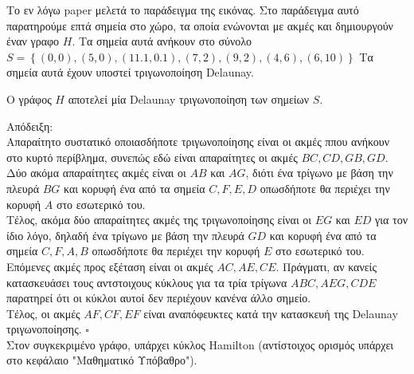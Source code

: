 \documentclass[oneside,12pt]{book}
\theoremstyle{definition}
\begin{document}
Το εν λόγω paper μελετά το παράδειγμα της εικόνας. Στο παράδειγμα αυτό παρατηρούμε επτά σημεία στο χώρο, τα οποία ενώνονται με ακμές και δημιουργούν έναν γραφο \(H\). Τα σημεία αυτά ανήκουν στο σύνολο \(S = \left\{(0,0),(5,0),(11.1,0.1),(7,2),(9,2),(4,6),(6,10)\right\}\) Τα σημεία αυτά έχουν υποστεί τριγωνοποίηση Delaunay. \\

\begin{mylemma}{}{}
	Ο γράφος \(Η\) αποτελεί μία Delaunay τριγωνοποίηση των σημείων \(S\).
\end{mylemma} 

Απόδειξη: \\
Απαραίτητο συστατικό οποιασδήποτε τριγωνοποίησης είναι οι ακμές ππου ανήκουν στο κυρτό περίβλημα, συνεπώς εδώ είναι απαραίτητες οι ακμές \(BC, CD, GB, GD\). \\
Δύο ακόμα απαραίτητες ακμές είναι οι \(AB\) και \(AG\), διότι ένα τρίγωνο με βάση την πλευρά \(BG\) και κορυφή ένα από τα σημεία \(C, F, E, D\) οπωσδήποτε θα περιέχει την κορυφή \(A\) στο εσωτερικό του. \\
Τέλος, ακόμα δύο απαραίτητες ακμές της τριγωνοποίησης είναι οι \(EG\) και \(ED\) για τον ίδιο λόγο, δηλαδή ένα τρίγωνο με βάση την πλευρά \(GD\) και κορυφή ένα από τα σημεία \(C, F, A, B\) οπωσδήποτε θα περιέχει την κορυφή \(E\) στο εσωτερικό του. \\
Επόμενες ακμές προς εξέταση είναι οι ακμές \(AC, AE, CE\). Πράγματι, αν κανείς κατασκευάσει τους αντστοιχους κύκλους για τα τρία τρίγωνα \(ABC, AEG, CDE\) παρατηρεί ότι οι κύκλοι αυτοί δεν περιέχουν κανένα άλλο σημείο. \\
Τέλος, οι ακμές \(AF, CF, EF\) είναι αναπόφευκτες κατά την κατασκευή της Delaunay τριγωνοποίησης. \(\square\) \\

Στον συγκεκριμένο γράφο, υπάρχει κύκλος Hamilton (αντίστοιχος ορισμός υπάρχει στο κεφάλαιο "Μαθηματικό Υπόβαθρο"). 
\end{document}
